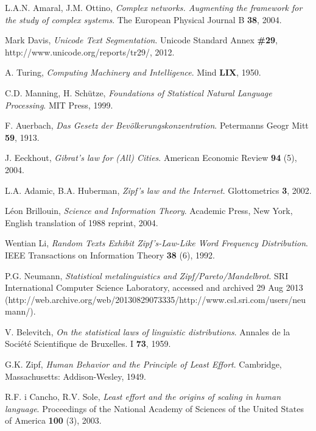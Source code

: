 \begin{thebibliography}{99}
	L.A.N. Amaral, J.M. Ottino,
	\emph{Complex networks. Augmenting the framework for the study of complex systems}.
	The European Physical Journal B \textbf{38},
	2004.
	
  Mark Davis,
  \emph{Unicode Text Segmentation}.
  Unicode Standard Annex \textbf{\#29}, http://www.unicode.org/reports/tr29/,
  2012.
  
  A. Turing,
  \emph{Computing Machinery and Intelligence}.
  Mind \textbf{LIX},
  1950.

  C.D. Manning, H. Schütze,
  \emph{Foundations of Statistical Natural Language Processing}.
  MIT Press,
  1999.

  F. Auerbach,
  \emph{Das Gesetz der Bevölkerungskonzentration}.
  Petermanns Geogr Mitt \textbf{59},
  1913.

  J. Eeckhout,
  \emph{Gibrat's law for (All) Cities}.
  American Economic Review \textbf{94} (5),
  2004.

  L.A. Adamic, B.A. Huberman,
  \emph{Zipf’s law and the Internet}.
  Glottometrics \textbf{3},
  2002.

  Léon Brillouin,
  \emph{Science and Information Theory}.
  Academic Press, New York,
  English translation of 1988 reprint,
  2004.

  Wentian Li,
  \emph{Random Texts Exhibit Zipf's-Law-Like Word Frequency Distribution}.
  IEEE Transactions on Information Theory \textbf{38} (6),
  1992.

  P.G. Neumann,
  \emph{Statistical metalinguistics and Zipf/Pareto/Mandelbrot}.
  SRI International Computer Science Laboratory,
  accessed and archived 29 Aug 2013 (http://web.archive.org/web/20130829073335/http://www.csl.sri.com/users/neumann/).

  V. Belevitch,
  \emph{On the statistical laws of linguistic distributions}.
  Annales de la Société Scientifique de Bruxelles. I \textbf{73},
  1959.

  G.K. Zipf,
  \emph{Human Behavior and the Principle of Least Effort}.
  Cambridge, Massachusetts: Addison-Wesley,
  1949.

  R.F. i Cancho, R.V. Sole,
  \emph{Least effort and the origins of scaling in human language}.
  Proceedings of the National Academy of Sciences of the United States of America \textbf{100} (3),
  2003.


\end{thebibliography}
